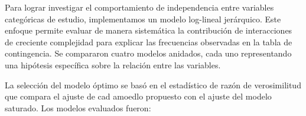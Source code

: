 

Para lograr investigar el comportamiento de independencia entre variables categóricas de estudio, implementamos
un modelo log-lineal jerárquico. Este enfoque permite evaluar de manera sistemática la contribución de interacciones
de creciente complejidad para explicar las frecuencias observadas en la tabla de contingencia. Se compararon cuatro
modelos anidados, cada uno representando una hipótesis específica sobre la relación entre las variables.

La selección del modelo óptimo se basó en el estadístico de razón de verosimilitud que compara el ajuste
de cad amoedlo propuesto con el ajuste del modelo saturado. Los modelos evaluados fueron:

